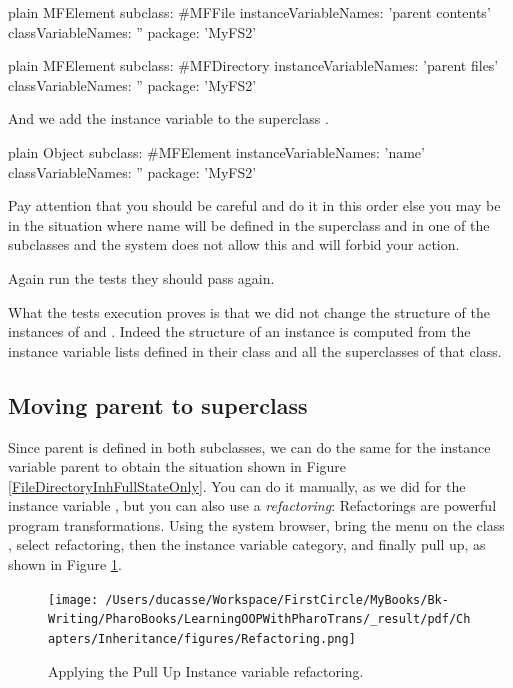 \documentclass[10pt,twoside,english]{_support/latex/sbabook/sbabook}
\begin{document}
\begin{displaycode}{plain}
MFElement subclass: #MFFile
	instanceVariableNames: 'parent contents'
	classVariableNames: ''
	package: 'MyFS2'
\end{displaycode}

\begin{displaycode}{plain}
MFElement subclass: #MFDirectory
	instanceVariableNames: 'parent files'
	classVariableNames: ''
	package: 'MyFS2'
\end{displaycode}

And we add the instance variable  to the superclass .

\begin{displaycode}{plain}
Object subclass: #MFElement
	instanceVariableNames: 'name'
	classVariableNames: ''
	package: 'MyFS2'
\end{displaycode}

Pay attention that you should be careful and do it in this order else you may be in the situation where name will be defined in the superclass and in one of the subclasses and the system does not allow this and will forbid your action. 

Again run the tests they should pass again. 

What the tests execution proves is that we did not change the structure of the instances of  and . Indeed the structure of an instance is computed from the instance variable lists defined in their class and all the superclasses of that class.
\subsection{Moving parent to superclass}
Since parent is defined in both subclasses, we can do the same for the instance variable parent to obtain the situation shown in Figure \ref{FileDirectoryInhFullStateOnly}.
You can do it manually, as we did for the instance variable , but you can also use a \textit{refactoring}: Refactorings are powerful program transformations. Using the system browser, bring the menu on the class , select refactoring, then the instance variable category, and finally pull up, as shown in Figure \ref{Refactoring}.


\begin{figure}

\begin{center}
\texttt{[image: /Users/ducasse/Workspace/FirstCircle/MyBooks/Bk-Writing/PharoBooks/LearningOOPWithPharoTrans/\_result/pdf/Chapters/Inheritance/figures/Refactoring.png]}\caption{Applying the Pull Up Instance variable refactoring.\label{Refactoring}}\end{center}
\end{figure}
\end{document}
